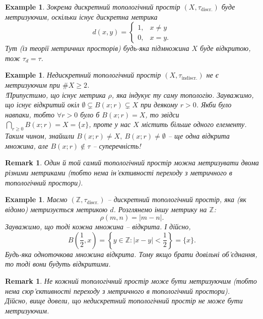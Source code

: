 \documentclass[a4paper, 10pt]{article}
\theoremstyle{theoremdd}
\newtheorem{example}[theorem]{Example}
\newtheorem{remark}[theorem]{Remark}
\begin{document}
\begin{example}
Зокрема дискретний топологічний простір $(X,\tau_{\text{discr.}})$ буде метризуючим, оскільки існує дискретна метрика 
\[
d(x,y) = \begin{cases} 1, & x \neq y \\ 0, & x = y. \end{cases}
\] 
Тут (\textit{із теорії метричних просторів}) будь-яка підмножина $X$ буде відкритою, тож $\tau_d = \tau$.
\end{example}

\begin{example}
Недискретний топологічний простір $(X,\tau_{\text{indiscr.}})$ не є метризуючим при $\#X \geq 2$.
\bigskip \\
!Припустимо, що існує метрика $\rho$, яка індукує ту саму топологію. Зауважимо, що існує відкритий окіл $\emptyset \subsetneq B(x;r) \subsetneq X$ при деякому $r > 0$. Якби було навпаки, тобто $\forall r > 0$ було б $B(x;r) = X$, то звідси $\displaystyle\bigcap_{r \geq 0} B(x;r) = X = \{x\}$, проте у нас $X$ містить більше одного елементу.\\
Таким чином, знайшли $B(x;r) \neq X,\ B(x;r) \neq \emptyset$ -- ще одна відкрита множина, але $B(x;r) \notin \tau$ -- суперечність!
\end{example}

\begin{remark}
Один й той самий топологічний простір можна метризувати двома різними метриками (тобто нема ін'єктивності переходу з метричного в топологічний простори).
\end{remark}

\begin{example}
\label{two_metric_spaces_same_topology}
Маємо $(\mathbb{Z},\tau_{\text{discr.}})$ -- дискретний топологічний простір, яка (як відомо) метризується метрикою $d$. Розглянемо іншу метрику на $\mathbb{Z}$:
\[
\rho(m,n) = |m-n|.
\] 
Зауважимо, що тоді кожна множина -- відкрита. І дійсно, 
\[
B\left( \dfrac{1}{2},x \right) = \left\{ y \in \mathbb{Z} : |x-y| < \dfrac{1}{2} \right\} = \{x\}.
\] 
Будь-яка одноточкова множина відкрита. Тому якщо брати довільні об'єднання, то тоді вони будуть відкритими.
\end{example}

\begin{remark}
Не кожний топологічний простір може бути метризуючим (тобто нема сюр'єктивності переходу з метричного в топологічний простори).\\
Дійсно, вище довели, що недискретний топологічний простір не може бути метризуючим.
\end{remark}
\end{document}
